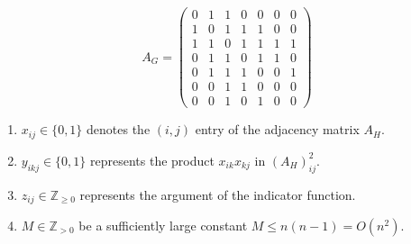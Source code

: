 \documentclass[10pt]{beamer}
\begin{document}
\begin{frame}
    \vspace{0.1cm}
    \[
    A_G=
    \begin{pmatrix}
    0&1&1&0&0&0&0\\
    1&0&1&1&1&0&0\\
    1&1&0&1&1&1&1\\
    0&1&1&0&1&1&0\\
    0&1&1&1&0&0&1\\
    0&0&1&1&0&0&0\\
    0&0&1&0&1&0&0
    \end{pmatrix}
    \]
\end{frame}

\begin{frame}
    \scriptsize
    \begin{enumerate}[label=\roman*), itemsep=2pt, leftmargin=*]
        \item $x_{ij}\in\{0,1\}$ denotes the $(i,j)$ entry of the adjacency matrix $A_H$.
        \item $y_{ikj}\in\{0,1\}$ represents the product $x_{ik}x_{kj}$ in $(A_H)^2_{ij}$.
        \item $z_{ij}\in\mathbb{Z}_{\geq 0}$ represents the argument of the indicator function.
        \item $M \in \mathbb{Z}_{> 0}$ be a sufficiently large constant $M \leq n(n -1) = O(n^2)$.
    \end{enumerate}

    \vspace{0.1cm}


\end{frame}
\end{document}
